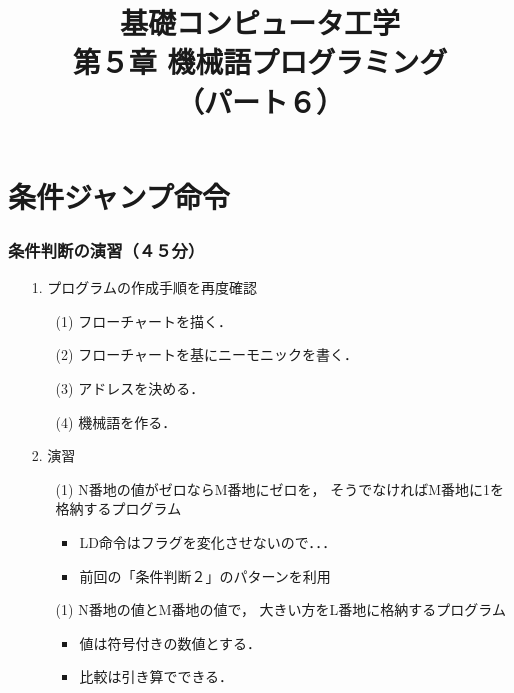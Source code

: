 \documentclass{beamer}                 %
\begin{document}
\title{基礎コンピュータ工学\\第５章 機械語プログラミング\\（パート６）}
\date{}

\begin{frame}
  \titlepage
\end{frame}


\section{条件ジャンプ命令}
\begin{frame}
  \frametitle{条件判断の演習（４５分）}
  \begin{enumerate}
  \item[1.] プログラムの作成手順を再度確認
    \begin{enumerate}
    \item[(1)] フローチャートを描く．
    \item[(2)] フローチャートを基にニーモニックを書く．
    \item[(3)] アドレスを決める．
    \item[(4)] 機械語を作る．
    \end{enumerate}
    \vfill
  \item[2.] 演習
    \begin{enumerate}
    \item[(1)] N番地の値がゼロならM番地にゼロを，
      そうでなければM番地に1を格納するプログラム
      \begin{itemize}
      \item LD命令はフラグを変化させないので．．．
      \item 前回の「条件判断２」のパターンを利用
      \end{itemize}
      \vfill
    \item[(1)] N番地の値とM番地の値で，
      大きい方をL番地に格納するプログラム
      \begin{itemize}
      \item 値は符号付きの数値とする．
      \item 比較は引き算でできる．
      \end{itemize}
    \end{enumerate}
  \end{enumerate}
  \vfill
\end{frame}
\end{document}
